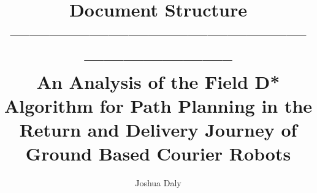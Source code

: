 \documentclass[12pt]{report}
\newlength{\defbaselineskip}
\newcommand{\setlinespacing}[1]%
           {\setlength{\baselineskip}{#1 \defbaselineskip}}
\begin{document}
\setlinespacing{1.5}

\title{Document Structure \\
-------------------------------------------------------------------- \\
An Analysis of the Field D* Algorithm for Path Planning in the Return and Delivery Journey of Ground Based Courier Robots}

\author{Joshua Daly}



\address{Dublin, Ireland}


\submitdate{\today}



\beforepreface

{ 
}

%

\afterpreface

\pagestyle{fancy}
\setcounter{page}{1}












\end{document}
